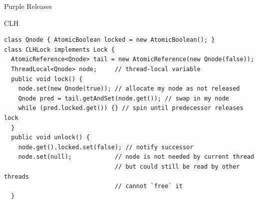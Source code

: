 \begin{frame}[noframenumbering]{Purple Releases}
\end{frame}

\begin{frame}[fragile]{CLH}
\begin{verbatim}
class Qnode { AtomicBoolean locked = new AtomicBoolean(); }
class CLHLock implements Lock {
  AtomicReference<Qnode> tail = new AtomicReference(new Qnode(false));
  ThreadLocal<Qnode> node;     // thread-local variable
  public void lock() {
    node.set(new Qnode(true)); // allocate my node as not released
    Qnode pred = tail.getAndSet(node.get()); // swap in my node
    while (pred.locked.get()) {} // spin until predecessor releases lock
  }
  public void unlock() {
    node.get().locked.set(false); // notify successor
    node.set(null);            // node is not needed by current thread
                               // but could still be read by other threads
                               // cannot `free` it
  }
\end{verbatim}
\end{frame}

